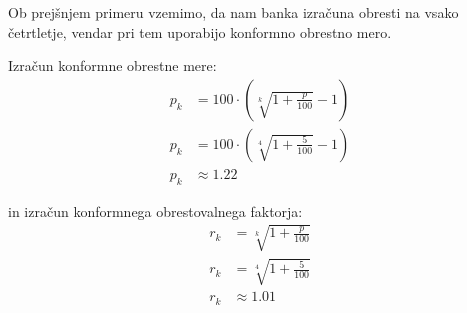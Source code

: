 \documentclass[12pt]{article}
\begin{document}
        Ob prejšnjem primeru vzemimo, da nam banka izračuna obresti na vsako četrtletje,
        vendar pri tem uporabijo konformno obrestno mero.

        Izračun konformne obrestne mere:
        \begin{equation}
            \begin{split}
                p_k & = 100 \cdot (\sqrt[k]{1 + \frac{p}{100}} - 1) \\
                p_k & = 100 \cdot (\sqrt[4]{1 + \frac{5}{100}} - 1) \\
                p_k & \approx 1.22
            \end{split}
        \end{equation}

        in izračun konformnega obrestovalnega faktorja:
        \begin{equation}
            \begin{split}
                r_k & = \sqrt[k]{1 + \frac{p}{100}} \\
                r_k & = \sqrt[4]{1 + \frac{5}{100}} \\
                r_k & \approx 1.01
            \end{split}
        \end{equation}
\end{document}
